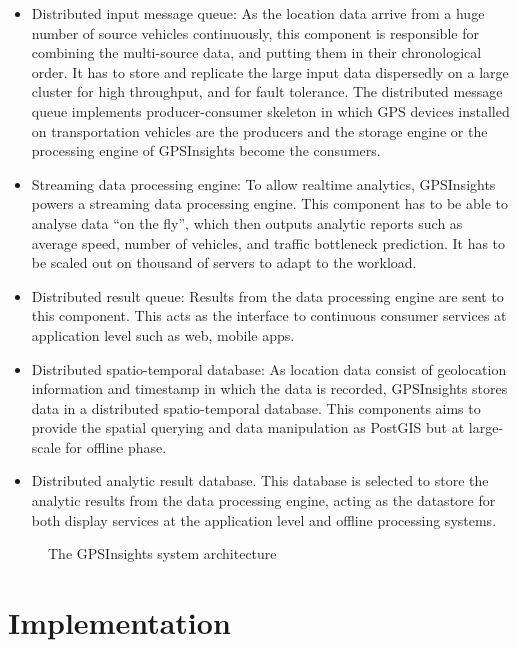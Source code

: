 \documentclass{acm_proc_article-sp}
\begin{document}
\begin{itemize}
\item 	Distributed input message queue: As the location data arrive from a huge number of source vehicles continuously, this component is responsible for combining the multi-source data, and putting them in their chronological order. It has to store and replicate the large input data dispersedly on a large cluster for high throughput, and for fault tolerance. The distributed message queue implements producer-consumer skeleton in which GPS devices installed on transportation vehicles are the producers and the storage engine or the processing engine of GPSInsights become the consumers.

\item  Streaming data processing engine: To allow realtime analytics, GPSInsights powers a streaming data processing engine. This component has to be able to analyse data ``on the fly'', which then outputs analytic reports such as average speed, number of vehicles, and traffic bottleneck prediction. It has to be scaled out on thousand of servers to adapt to the workload.

\item  Distributed result queue: Results from the data processing engine are sent to this component. This acts as the interface to continuous consumer services at application level such as web, mobile apps. 

\item  Distributed spatio-temporal database: As location data consist of geolocation information and timestamp in which the data is recorded, GPSInsights stores data in a distributed spatio-temporal database. This components aims to provide the spatial querying and data manipulation as PostGIS but at large-scale for offline phase. 

\item  Distributed analytic result database. This database is selected to store the analytic results from the data processing engine, acting as the datastore for both display services at the application level and offline processing systems. 

\end{itemize}

\begin{figure}[h]
\centering
{}
\caption{The GPSInsights system architecture}
\label{architecture}
\end{figure}


\section{Implementation} 
\end{document}
